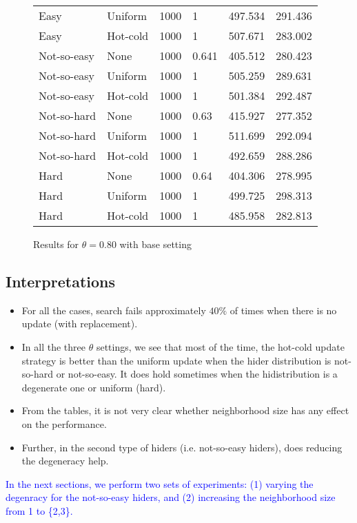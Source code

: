 \documentclass[11pt,a4paper,draft]{article}
\begin{document}
\begin{figure}[!htb]
\begin{tabular}{llllll}
		Easy & Uniform & 1000 & 1 & 497.534 & 291.436 \\
		Easy & Hot-cold & 1000 & 1 & 507.671 & 283.002 \\ \hline
		Not-so-easy & None & 1000 & 0.641 & 405.512 & 280.423 \\
		Not-so-easy & Uniform & 1000 & 1 & 505.259 & 289.631 \\
		Not-so-easy & Hot-cold & 1000 & 1 & 501.384 & 292.487 \\ \hline
		Not-so-hard & None & 1000 & 0.63 & 415.927 & 277.352 \\
		Not-so-hard & Uniform & 1000 & 1 & 511.699 & 292.094 \\
		Not-so-hard & Hot-cold & 1000 & 1 & 492.659 & 288.286 \\ \hline
		Hard & None & 1000 & 0.64 & 404.306 & 278.995 \\
		Hard & Uniform & 1000 & 1 & 499.725 & 298.313 \\
		Hard & Hot-cold & 1000 & 1 & 485.958 & 282.813 \\ \hline\hline
	\end{tabular}
\caption{Results for $\theta = 0.80$ with base setting}
\end{figure}

\pagebreak

\subsection{Interpretations}

\begin{itemize}
	\item For all the cases, search fails approximately $40\%$ of times when there is no update (with replacement).
	\item In all the three $\theta$ settings, we see that most of the time, the hot-cold update strategy is better than the uniform update when the hider distribution is not-so-hard or not-so-easy. It does hold sometimes when the hidistribution is a degenerate one or uniform (hard).
	\item From the tables, it is not very clear whether neighborhood size has any effect on the performance.
	\item Further, in the second type of hiders (i.e. not-so-easy hiders), does reducing the degeneracy help.
\end{itemize}

\noindent
\textcolor{blue}{In the next sections, we perform two sets of experiments: (1) varying the degenracy for the not-so-easy hiders, and (2) increasing the neighborhood size from 1 to \{2,3\}.}
\end{document}
